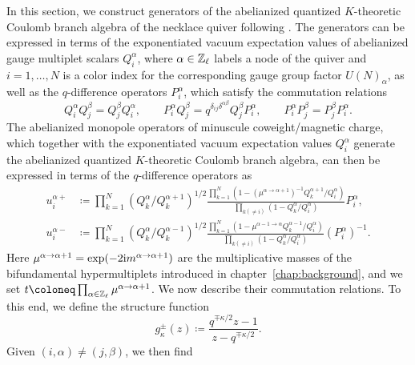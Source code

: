 In this section, we construct generators of the abelianized quantized $K$-theoretic Coulomb branch algebra of the necklace quiver following \cite[remark 2.10]{tsymbaliuk_difference_2023}. The generators can be expressed in terms of the exponentiated vacuum expectation values of abelianized gauge multiplet scalars $Q_i^\alpha$, where $\alpha \in \mathbb{Z}_\ell$ labels a node of the quiver and $i = 1,\dots,N$ is a color index for the corresponding gauge group factor $U(N)_\alpha$, as well as the $q$-difference operators $P_i^\alpha$, which satisfy the commutation relations
\begin{equation}
    Q_i^\alpha Q_j^\beta = Q_j^\beta Q_i^\alpha, \qquad P_i^\alpha Q_j^\beta = q^{\delta_{ij} \delta^{\alpha\beta}} Q_j^\beta P_i^\alpha, \qquad P_i^\alpha P_j^\beta = P_j^\beta P_i^\alpha.
\end{equation}
The abelianized monopole operators of minuscule coweight/magnetic charge, which together with the exponentiated vacuum expectation values $Q_i^\alpha$ generate the abelianized quantized $K$-theoretic Coulomb branch algebra, can then be expressed in terms of the $q$-difference operators as 
\begin{align}
    u_i^{\alpha+} &\coloneq \prod_{k=1}^N (Q_k^\alpha/Q_k^{\alpha+1})^{1/2} \frac{\prod_{k=1}^N (1-(\mu^{\alpha\to\alpha+1})^{-1} Q_k^{\alpha+1}/Q_i^\alpha)}{\prod_{k(\neq i)} (1-Q_k^\alpha/Q_i^\alpha)} P_i^\alpha, \\
    u_i^{\alpha-} &\coloneq \prod_{k=1}^N (Q_k^\alpha/Q_k^{\alpha-1})^{1/2} \frac{\prod_{k=1}^N (1-\mu^{\alpha-1\to\alpha} Q_k^{\alpha-1}/Q_i^\alpha)}{\prod_{k(\neq i)} (1-Q_k^\alpha/Q_i^\alpha)} (P_i^\alpha)^{-1}.
\end{align}
Here $\mu^{\alpha\to\alpha+1} = \exp(-2\mathrm{i} m^{\alpha\to\alpha+1})$ are the multiplicative masses of the bifundamental hypermultiplets introduced in chapter~\ref{chap:background}, and we set $t \coloneq \prod_{\alpha \in \Z_\ell} \mu^{\alpha\to\alpha+1}$.
We now describe their commutation relations. To this end, we define the structure function
\begin{equation}
    g_\kappa^\pm(z) \coloneq \frac{q^{\mp\kappa/2} z - 1}{z - q^{\mp\kappa/2}}.
\end{equation}
Given $(i,\alpha) \neq (j,\beta)$, we then find
